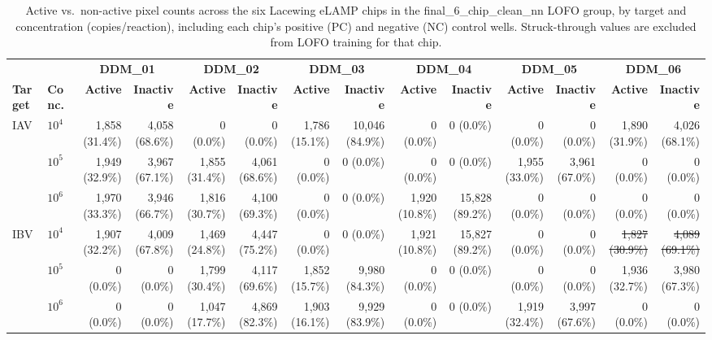 \begin{table}[htbp]
    \centering
    \caption{Active vs.\ non-active pixel counts across the six Lacewing eLAMP chips in the final\_6\_chip\_clean\_nn LOFO group, by target and concentration (copies/reaction), including each chip's positive (PC) and negative (NC) control wells. Struck-through values are excluded from LOFO training for that chip.}
    \label{tab:final_6chip_pixel_activity}
    \small
    \begin{tabular}{@{}llrrrrrrrrrrrr@{}}
    \toprule
     &  & \multicolumn{2}{c}{\textbf{DDM_01}} & \multicolumn{2}{c}{\textbf{DDM_02}} & \multicolumn{2}{c}{\textbf{DDM_03}} & \multicolumn{2}{c}{\textbf{DDM_04}} & \multicolumn{2}{c}{\textbf{DDM_05}} & \multicolumn{2}{c}{\textbf{DDM_06}} \\
    \cmidrule(lr){3-4} \cmidrule(lr){5-6} \cmidrule(lr){7-8} \cmidrule(lr){9-10} \cmidrule(lr){11-12} \cmidrule(lr){13-14}
    \textbf{Target} & \textbf{Conc.} & \textbf{Active} & \textbf{Inactive} & \textbf{Active} & \textbf{Inactive} & \textbf{Active} & \textbf{Inactive} & \textbf{Active} & \textbf{Inactive} & \textbf{Active} & \textbf{Inactive} & \textbf{Active} & \textbf{Inactive} \\
    \midrule
    \multirow{3}{*}{IAV} & $10^4$ & 1,858 (31.4\%) & 4,058 (68.6\%) & 0 (0.0\%) & 0 (0.0\%) & 1,786 (15.1\%) & 10,046 (84.9\%) & 0 (0.0\%) & 0 (0.0\%) & 0 (0.0\%) & 0 (0.0\%) & 1,890 (31.9\%) & 4,026 (68.1\%) \\
     & $10^5$ & 1,949 (32.9\%) & 3,967 (67.1\%) & 1,855 (31.4\%) & 4,061 (68.6\%) & 0 (0.0\%) & 0 (0.0\%) & 0 (0.0\%) & 0 (0.0\%) & 1,955 (33.0\%) & 3,961 (67.0\%) & 0 (0.0\%) & 0 (0.0\%) \\
     & $10^6$ & 1,970 (33.3\%) & 3,946 (66.7\%) & 1,816 (30.7\%) & 4,100 (69.3\%) & 0 (0.0\%) & 0 (0.0\%) & 1,920 (10.8\%) & 15,828 (89.2\%) & 0 (0.0\%) & 0 (0.0\%) & 0 (0.0\%) & 0 (0.0\%) \\
    \midrule
    \multirow{3}{*}{IBV} & $10^4$ & 1,907 (32.2\%) & 4,009 (67.8\%) & 1,469 (24.8\%) & 4,447 (75.2\%) & 0 (0.0\%) & 0 (0.0\%) & 1,921 (10.8\%) & 15,827 (89.2\%) & 0 (0.0\%) & 0 (0.0\%) & \sout{1,827 (30.9\%)} & \sout{4,089 (69.1\%)} \\
     & $10^5$ & 0 (0.0\%) & 0 (0.0\%) & 1,799 (30.4\%) & 4,117 (69.6\%) & 1,852 (15.7\%) & 9,980 (84.3\%) & 0 (0.0\%) & 0 (0.0\%) & 0 (0.0\%) & 0 (0.0\%) & 1,936 (32.7\%) & 3,980 (67.3\%) \\
     & $10^6$ & 0 (0.0\%) & 0 (0.0\%) & 1,047 (17.7\%) & 4,869 (82.3\%) & 1,903 (16.1\%) & 9,929 (83.9\%) & 0 (0.0\%) & 0 (0.0\%) & 1,919 (32.4\%) & 3,997 (67.6\%) & 0 (0.0\%) & 0 (0.0\%) \\

\end{tabular}
\end{table}
